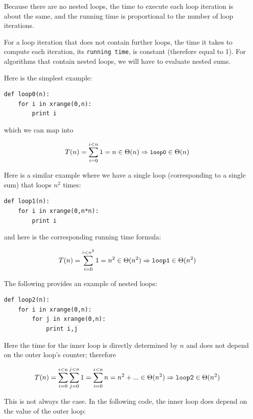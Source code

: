 \documentclass[justified,sixbynine]{tufte-book}
\def\ft{\small\tt}
\theoremstyle{plain}%
\theoremstyle{definition}
\theoremstyle{remark}
\begin{document}
\begin{fullwidth}
Because there are no nested loops, the time to execute each loop iteration is about the same, and the running time is proportional to the number of loop iterations.

For a loop iteration that does not contain further loops, the time it takes to compute each iteration, its {\ft running time}, is constant (therefore equal to 1). For algorithms that contain nested loops, we will have to evaluate nested sums.

Here is the simplest example:

\begin{lstlisting}
def loop0(n):
    for i in xrange(0,n):
        print i
\end{lstlisting}

which we can map into

\begin{equation}
T(n)=\sum_{i=0}^{i<n}1=n\in \Theta (n)\Rightarrow \text{{\ft loop0}}\in
\Theta (n)
\end{equation}

Here is a similar example where we have a single loop (corresponding to a single sum) that loops $n^2$ times:

\begin{lstlisting}
def loop1(n):
    for i in xrange(0,n*n):
        print i
\end{lstlisting}

and here is the corresponding running time formula:

\begin{equation}
T(n)=\sum_{i=0}^{i<n^2}1=n^2\in \Theta (n^2)\Rightarrow \text{{\tt loop1}}%
\in \Theta (n^2)
\end{equation}

The following provides an example of nested loops:

\begin{lstlisting}
def loop2(n):
    for i in xrange(0,n):
        for j in xrange(0,n):
            print i,j
\end{lstlisting}

Here the time for the inner loop is directly determined by $n$ and does not depend on the outer loop's counter; therefore

\begin{equation}
T(n)=\sum_{i=0}^{i<n}\sum_{j=0}^{j<n}1=\sum_{i=0}^{i<n}n=n^2+...\in \Theta
(n^2)\Rightarrow \text{{\tt loop2}}\in \Theta (n^2)
\end{equation}

This is not always the case. In the following code, the inner loop does depend on the value of the outer loop:


\end{fullwidth}
\end{document}
